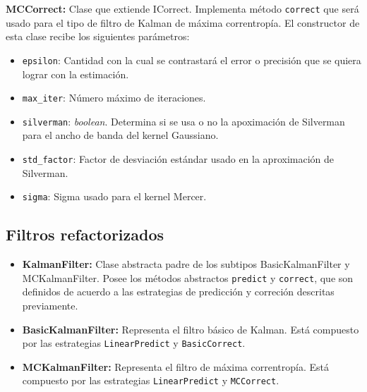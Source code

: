 \textbf{MCCorrect:} Clase que extiende ICorrect. Implementa m\'etodo \texttt{correct} que ser\'a usado para el tipo de filtro de Kalman de m\'axima correntrop\'ia. El constructor de esta clase recibe los siguientes par\'ametros:

\begin{itemize}
\item \texttt{epsilon}: Cantidad con la cual se contrastar\'a el error o precisi\'on que se quiera lograr con la estimaci\'on.
\item \texttt{max\_iter}: N\'umero m\'aximo de iteraciones.
\item \texttt{silverman}: \textit{boolean}. Determina si se usa o no la apoximaci\'on de Silverman para el ancho de banda del kernel Gaussiano.
\item \texttt{std\_factor}: Factor de desviaci\'on est\'andar usado en la aproximaci\'on de Silverman.
\item \texttt{sigma}: Sigma usado para el kernel Mercer.
\end{itemize}

\subsection{Filtros refactorizados}

\begin{itemize}
\item \textbf{KalmanFilter:} Clase abstracta padre de los subtipos BasicKalmanFilter y MCKalmanFilter. Posee los m\'etodos abstractos \texttt{predict} y \texttt{correct}, que son definidos de acuerdo a las estrategias de predicci\'on y correci\'on descritas previamente.
\item \textbf{BasicKalmanFilter:} Representa el filtro b\'asico de Kalman. Est\'a compuesto por las estrategias \texttt{LinearPredict} y \texttt{BasicCorrect}.
\item \textbf{MCKalmanFilter:} Representa el filtro de m\'axima correntrop\'ia. Est\'a compuesto por las estrategias \texttt{LinearPredict} y \texttt{MCCorrect}.
\end{itemize}
\bigskip

